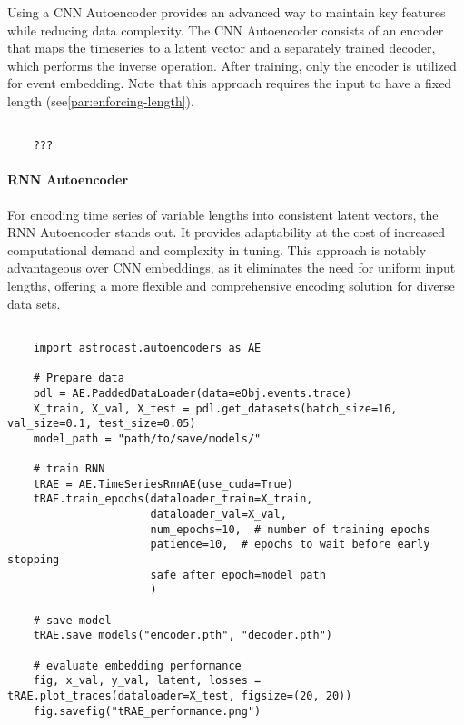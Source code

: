 Using a \ac{CNN} Autoencoder provides an advanced way to maintain key features while reducing data complexity. The CNN Autoencoder consists of an encoder that maps the timeseries to a latent vector and a separately trained decoder, which performs the inverse operation. After training, only the encoder is utilized for event embedding. Note that this approach requires the input to have a fixed length (see\ref{par:enforcing-length}).

\begin{lstlisting}[style=pyStyle]

    ???

\end{lstlisting}


\paragraph{\ac{RNN} Autoencoder}

For encoding time series of variable lengths into consistent latent vectors, the \ac{RNN} Autoencoder stands out. It provides adaptability at the cost of increased computational demand and complexity in tuning. This approach is notably advantageous over CNN embeddings, as it eliminates the need for uniform input lengths, offering a more flexible and comprehensive encoding solution for diverse data sets.

\begin{lstlisting}[style=pyStyle]

    import astrocast.autoencoders as AE

    # Prepare data
    pdl = AE.PaddedDataLoader(data=eObj.events.trace)
    X_train, X_val, X_test = pdl.get_datasets(batch_size=16, val_size=0.1, test_size=0.05)
    model_path = "path/to/save/models/"

    # train RNN
    tRAE = AE.TimeSeriesRnnAE(use_cuda=True)
    tRAE.train_epochs(dataloader_train=X_train,
                      dataloader_val=X_val,
                      num_epochs=10,  # number of training epochs
                      patience=10,  # epochs to wait before early stopping
                      safe_after_epoch=model_path
                      )

    # save model
    tRAE.save_models("encoder.pth", "decoder.pth")

    # evaluate embedding performance
    fig, x_val, y_val, latent, losses = tRAE.plot_traces(dataloader=X_test, figsize=(20, 20))
    fig.savefig("tRAE_performance.png")

\end{lstlisting}

